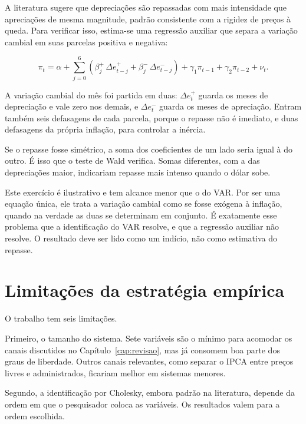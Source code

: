 \documentclass[12pt,openright,oneside,a4paper,portuguese,brazil]{abntex2}
\begin{document}
A literatura sugere que depreciações são repassadas com mais intensidade que
apreciações de mesma magnitude, padrão consistente com a rigidez de preços à
queda. Para verificar isso, estima-se uma regressão auxiliar que separa a
variação cambial em suas parcelas positiva e negativa:

\begin{equation}
\pi_t = \alpha
+ \sum_{j=0}^{6}\left( \beta^{+}_j\,\Delta e^{+}_{t-j}
                     + \beta^{-}_j\,\Delta e^{-}_{t-j} \right)
+ \gamma_1 \pi_{t-1} + \gamma_2 \pi_{t-2} + \nu_t .
\label{eq:assimetria}
\end{equation}

A variação cambial do mês foi partida em duas: $\Delta e^{+}_t$ guarda os
meses de depreciação e vale zero nos demais, e $\Delta e^{-}_t$ guarda os
meses de apreciação. Entram também seis defasagens de cada parcela, porque o
repasse não é imediato, e duas defasagens da própria inflação, para controlar
a inércia.

Se o repasse fosse simétrico, a soma dos coeficientes de um lado seria igual à
do outro. É isso que o teste de Wald verifica. Somas diferentes, com a das
depreciações maior, indicariam repasse mais intenso quando o dólar sobe.

Este exercício é ilustrativo e tem alcance menor que o do VAR. Por ser uma
equação única, ele trata a variação cambial como se fosse exógena à inflação,
quando na verdade as duas se determinam em conjunto. É exatamente esse
problema que a identificação do VAR resolve, e que a regressão auxiliar não
resolve. O resultado deve ser lido como um indício, não como estimativa do
repasse.

\section{Limitações da estratégia empírica}
\label{sec:limitacoes}

O trabalho tem seis limitações.

Primeiro, o tamanho do sistema. Sete variáveis são o mínimo para acomodar os
canais discutidos no Capítulo~\ref{cap:revisao}, mas já consomem boa parte dos
graus de liberdade. Outros canais relevantes, como separar o IPCA entre preços
livres e administrados, ficariam melhor em sistemas menores.

Segundo, a identificação por Cholesky, embora padrão na literatura, depende da
ordem em que o pesquisador coloca as variáveis. Os resultados valem para a
ordem escolhida.
\end{document}
